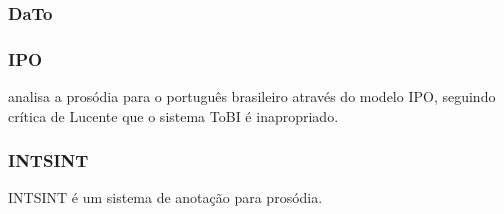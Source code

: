 \subsubsection{DaTo}

\subsubsection{IPO}
\cite{ipo} analisa a prosódia para o português brasileiro através do modelo IPO,
seguindo crítica de Lucente que o sistema ToBI é inapropriado.
\subsubsection{INTSINT}
INTSINT é um sistema de anotação para prosódia.
